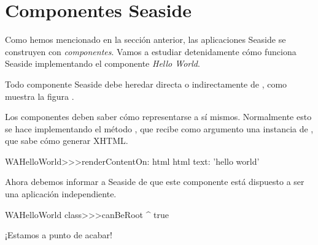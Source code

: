 \documentclass[a4paper,10pt,twoside]{book}
\begin{document}
\section{Componentes Seaside}


Como hemos mencionado en la sección anterior, las aplicaciones Seaside se  construyen con \emph{componentes}.
Vamos a estudiar detenidamente cómo funciona Seaside implementando el componente \emph{Hello World}.

Todo componente Seaside debe heredar directa o indirectamente de , como muestra la figura .


Los componentes deben saber cómo representarse a sí mismos.
Normalmente esto se hace implementando el método , que recibe como argumento una instancia de , que sabe cómo generar XHTML.


\begin{code}{}
WAHelloWorld>>>renderContentOn: html
	html text: 'hello world'
\end{code}

\noindent
Ahora debemos informar a Seaside de que este componente está dispuesto a ser una aplicación independiente.


\begin{code}{}
WAHelloWorld class>>>canBeRoot
	^ true
\end{code}

\noindent
¡Estamos a punto de acabar!

\end{document}

